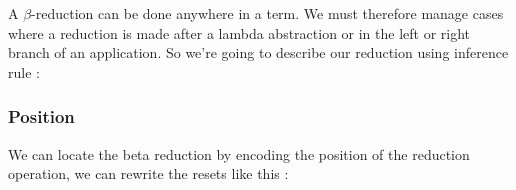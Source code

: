 \documentclass{article}
\theoremstyle{plain}
\theoremstyle{plain}
\begin{document}
  A $\beta$-reduction can be done anywhere in a term. We must therefore manage
  cases where a reduction is made after a lambda abstraction or in the left or
  right branch of an application. So we're going to describe our reduction
  using inference rule :




  \subsubsection{Position}

  We can locate the beta reduction by encoding the position of the reduction
  operation, we can rewrite the resets like this :

\end{document}
